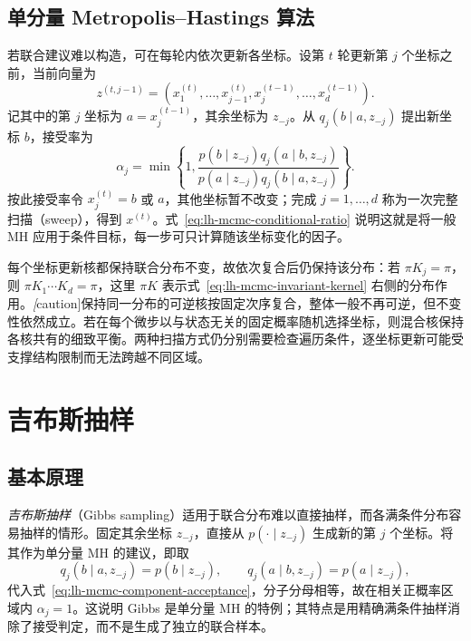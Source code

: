 \subsection{单分量 Metropolis--Hastings 算法}
\label{subsec:lh-mcmc-component-mh}

若联合建议难以构造，可在每轮内依次更新各坐标。设第 $t$ 轮更新第 $j$ 个坐标之前，当前向量为
\begin{equation}
z^{(t,j-1)}=(x_1^{(t)},\ldots,x_{j-1}^{(t)},
x_j^{(t-1)},\ldots,x_d^{(t-1)}).
\label{eq:lh-mcmc-partial-sweep}
\end{equation}
记其中的第 $j$ 坐标为 $a=x_j^{(t-1)}$，其余坐标为 $z_{-j}$。从 $q_j(b\mid a,z_{-j})$ 提出新坐标 $b$，接受率为
\begin{equation}
\alpha_j=\min\left\{1,
\frac{p(b\mid z_{-j})q_j(a\mid b,z_{-j})}
{p(a\mid z_{-j})q_j(b\mid a,z_{-j})}\right\}.
\label{eq:lh-mcmc-component-acceptance}
\end{equation}
按此接受率令 $x_j^{(t)}=b$ 或 $a$，其他坐标暂不改变；完成 $j=1,\ldots,d$ 称为一次完整扫描（sweep），得到 $x^{(t)}$。式~\eqref{eq:lh-mcmc-conditional-ratio} 说明这就是将一般 MH 应用于条件目标，每一步可只计算随该坐标变化的因子。

每个坐标更新核都保持联合分布不变，故依次复合后仍保持该分布：若 $\pi K_j=\pi$，则 $\pi K_1\cdots K_d=\pi$，这里 $\pi K$ 表示式~\eqref{eq:lh-mcmc-invariant-kernel} 右侧的分布作用。\emph[caution]{保持同一分布的可逆核按固定次序复合，整体一般不再可逆}，但不变性依然成立。若在每个微步以与状态无关的固定概率随机选择坐标，则混合核保持各核共有的细致平衡。两种扫描方式仍分别需要检查遍历条件，逐坐标更新可能受支撑结构限制而无法跨越不同区域。

\section{吉布斯抽样}
\label{sec:lh-mcmc-gibbs}

\subsection{基本原理}
\label{subsec:lh-mcmc-gibbs-principle}

\emph{吉布斯抽样}（Gibbs sampling）适用于联合分布难以直接抽样，而各满条件分布容易抽样的情形。固定其余坐标 $z_{-j}$，直接从 $p(\cdot\mid z_{-j})$ 生成新的第 $j$ 个坐标。将其作为单分量 MH 的建议，即取
\[
q_j(b\mid a,z_{-j})=p(b\mid z_{-j}),\qquad
q_j(a\mid b,z_{-j})=p(a\mid z_{-j}),
\]
代入式~\eqref{eq:lh-mcmc-component-acceptance}，分子分母相等，故在相关正概率区域内 $\alpha_j=1$。这说明 Gibbs 是单分量 MH 的特例；其特点是用精确满条件抽样消除了接受判定，而不是生成了独立的联合样本。

